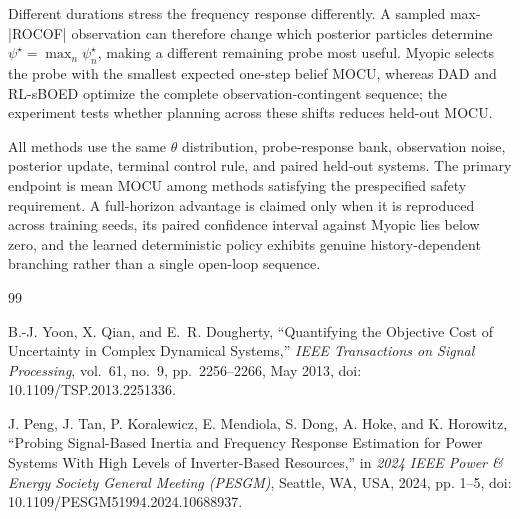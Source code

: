 \documentclass[11pt]{article}
\begin{document}
Different durations stress the frequency response differently. A sampled
max-|ROCOF| observation can therefore change which posterior particles
determine \(\psi^\star=\max_n\psi_n^\star\), making a
different remaining probe most useful. Myopic selects the probe with the
smallest expected one-step belief MOCU, whereas DAD and RL-sBOED optimize the
complete observation-contingent sequence; the experiment tests whether planning
across these shifts reduces held-out MOCU.

All methods use the same \(\theta\) distribution, probe-response bank,
observation noise, posterior update, terminal control rule, and paired
held-out systems. The primary endpoint is mean MOCU among methods satisfying
the prespecified safety requirement. A full-horizon advantage is claimed only
when it is reproduced across training seeds, its paired confidence interval
against Myopic lies below zero, and the learned deterministic policy exhibits
genuine history-dependent branching rather than a single open-loop sequence.

\begin{thebibliography}{99}

B.-J. Yoon, X. Qian, and E.~R. Dougherty,
``Quantifying the Objective Cost of Uncertainty in Complex Dynamical Systems,''
\emph{IEEE Transactions on Signal Processing}, vol.~61, no.~9,
pp.~2256--2266, May 2013,
doi: 10.1109/TSP.2013.2251336.

J. Peng, J. Tan, P. Koralewicz, E. Mendiola, S. Dong, A. Hoke, and K. Horowitz,
``Probing Signal-Based Inertia and Frequency Response Estimation for Power Systems With High Levels of Inverter-Based Resources,''
in \emph{2024 IEEE Power \& Energy Society General Meeting (PESGM)},
Seattle, WA, USA, 2024, pp. 1--5,
doi: 10.1109/PESGM51994.2024.10688937.

\end{thebibliography}
\end{document}
